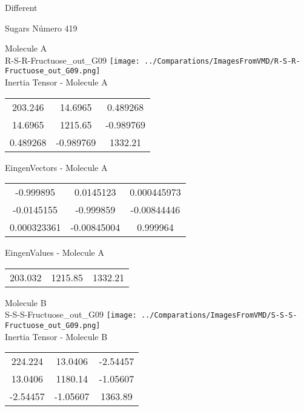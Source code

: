 \begin{center}
\vtab
\vtab
\textcolor{NavyBlue}{\Large Different}
\end{center}

 \newpage

\vtab[-2cm]
\begin{center}
{\large Sugars \tab Número 419}
\end{center}
\begin{multicols}{2}
\begin{center}

Molecule A \\ 
R-S-R-Fructuose\_out\_G09
\texttt{[image: ../Comparations/ImagesFromVMD/R-S-R-Fructuose\_out\_G09.png]}
\\
Inertia Tensor - Molecule A \\
\vtab

\begin{tabular}{|c c c|}
203.246	 & 	14.6965	 & 	0.489268	 \\
14.6965	 & 	1215.65	 & 	-0.989769	 \\
0.489268	 & 	-0.989769	 & 	1332.21
\end{tabular}

\vtab
 EingenVectors - Molecule A     \\
\vtab
\begin{tabular}{|c c c|}
-0.999895	 & 	0.0145123	 & 	0.000445973	 \\
-0.0145155	 & 	-0.999859	 & 	-0.00844446	 \\
0.000323361	 & 	-0.00845004	 & 	0.999964
\end{tabular}

\vtab
 EingenValues - Molecule A     \\
\vtab
\begin{tabular}{|c c c|}
203.032	 & 	1215.85	 & 	1332.21	 \\
\end{tabular}
\columnbreak

Molecule B \\ 
S-S-S-Fructuose\_out\_G09
\texttt{[image: ../Comparations/ImagesFromVMD/S-S-S-Fructuose\_out\_G09.png]}
\\
Inertia Tensor - Molecule B \\
\vtab

\begin{tabular}{|c c c|}
224.224	 & 	13.0406	 & 	-2.54457	 \\
13.0406	 & 	1180.14	 & 	-1.05607	 \\
-2.54457	 & 	-1.05607	 & 	1363.89
\end{tabular}


\end{center}
\end{multicols}
